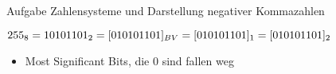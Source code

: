 \begin{frame}[allowframebreaks]{Aufgabe \thesection}{Zahlensysteme und Darstellung negativer Kommazahlen}
\begin{solution}
  \end{solution}
  \begin{solutionnoinc}
    $255_{8} = 10 101 101_2 \newline\newline = [010 101 101]_{BV} \newline\newline = [010 101 101]_{1} \newline\newline = [010 101 101]_{2}$
  \end{solutionnoinc}
  \begin{Sidenote}
    \begin{itemize}
      \item Most Significant Bits, die $0$ sind fallen weg
    \end{itemize}
  \end{Sidenote}
\end{frame}
